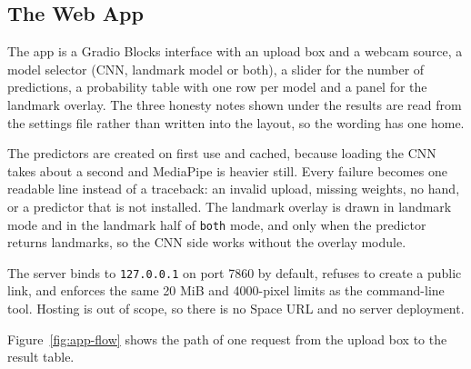 \subsection{The Web App}

The app is a Gradio Blocks interface with an upload box and a webcam source, a model selector (CNN, landmark model or both), a slider for the number of predictions, a probability table with one row per model and a panel for the landmark overlay. The three honesty notes shown under the results are read from the settings file rather than written into the layout, so the wording has one home.

The predictors are created on first use and cached, because loading the CNN takes about a second and MediaPipe is heavier still. Every failure becomes one readable line instead of a traceback: an invalid upload, missing weights, no hand, or a predictor that is not installed. The landmark overlay is drawn in landmark mode and in the landmark half of \texttt{both} mode, and only when the predictor returns landmarks, so the CNN side works without the overlay module.

The server binds to \texttt{127.0.0.1} on port 7860 by default, refuses to create a public link, and enforces the same 20 MiB and 4000-pixel limits as the command-line tool. Hosting is out of scope, so there is no Space URL and no server deployment.

Figure~\ref{fig:app-flow} shows the path of one request from the upload box to the result table.

